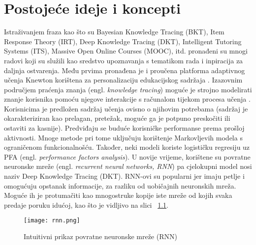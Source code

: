 \chapter{Postojeće ideje i koncepti}
Istraživanjem fraza kao što su Bayesian Knowledge Tracing (BKT), Item Response Theory (IRT), Deep Knowledge Tracing (DKT), Intelligent Tutoring Systems (ITS), Massive Open Online Courses (MOOC), itd. pronađeni su mnogi radovi koji su služili kao sredstvo upoznavanja s tematikom rada i inpiracija za daljnja ostvarenja. 
\newline
\newline
Među prvima pronađena je i proučena platforma adaptivnog učenja Knewton korištena za personalizaciju edukacijskog sadržaja \citep{knewton}. 
\newline
\newline
Izazovnim područjem praćenja znanja (engl. \textit{knowledge tracing}) moguće je strojno modelirati znanje korisnika pomoću njegove interakcije s računalom tijekom procesa učenja \citep{dkt}. Korisnicima je predložen sadržaj učenja ovisno o njihovim potrebama (sadržaj je okarakteriziran kao prelagan, pretežak, moguće ga je potpuno preskočiti ili ostaviti za kasnije). Predviđaju se buduće korisničke performanse prema prošloj aktivnosti. Mnoge metode pri tome uključuju korištenje Markovljevih modela s ograničenom funkcionalnošću. Također, neki modeli koriste logističku regresiju uz PFA (engl. \textit{performance factors analysis}). U novije vrijeme, korištene su povratne neuronske mreže (engl. \textit{recurrent neural networks, RNN}) pa cjelokupni model nosi naziv Deep Knowledge Tracing (DKT). \newline
RNN-ovi su popularni jer imaju petlje i omogućuju opstanak informacije, za razliku od uobičajnih neuronskih mreža. Moguće ih je protumačiti kao mnogostruke kopije iste mreže od kojih svaka predaje poruku idućoj, kao što je vidljivo na slici ~\ref{fig:rnn}.
\pagebreak

\begin{figure}[!htb]
	\centering
	\texttt{[image: rnn.png]}
	\caption{Intuitivni prikaz povratne neuronske mreže (RNN)}
	\label{fig:rnn}
\end{figure}

